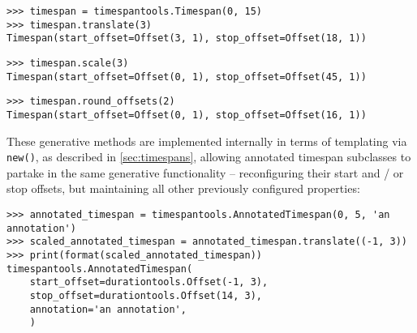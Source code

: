 \begin{abjadbookoutput}
\begin{singlespacing}
\vspace{-0.5\baselineskip}
\begin{lstlisting}
>>> timespan = timespantools.Timespan(0, 15)
>>> timespan.translate(3)
Timespan(start_offset=Offset(3, 1), stop_offset=Offset(18, 1))
\end{lstlisting}
\begin{lstlisting}
>>> timespan.scale(3)
Timespan(start_offset=Offset(0, 1), stop_offset=Offset(45, 1))
\end{lstlisting}
\begin{lstlisting}
>>> timespan.round_offsets(2)
Timespan(start_offset=Offset(0, 1), stop_offset=Offset(16, 1))
\end{lstlisting}
\end{singlespacing}
\end{abjadbookoutput}

\noindent These generative methods are implemented internally in terms of
templating via \texttt{new()}, as described in \autoref{sec:timespans},
allowing annotated timespan subclasses to partake in the same generative
functionality -- reconfiguring their start and / or stop offsets, but
maintaining all other previously configured properties:

\begin{comment}
<abjad>
annotated_timespan = timespantools.AnnotatedTimespan(0, 5, 'an annotation')
scaled_annotated_timespan = annotated_timespan.translate((-1, 3))
print(format(scaled_annotated_timespan))
</abjad>
\end{comment}

\begin{abjadbookoutput}
\begin{singlespacing}
\vspace{-0.5\baselineskip}
\begin{lstlisting}
>>> annotated_timespan = timespantools.AnnotatedTimespan(0, 5, 'an annotation')
>>> scaled_annotated_timespan = annotated_timespan.translate((-1, 3))
>>> print(format(scaled_annotated_timespan))
timespantools.AnnotatedTimespan(
    start_offset=durationtools.Offset(-1, 3),
    stop_offset=durationtools.Offset(14, 3),
    annotation='an annotation',
    )
\end{lstlisting}
\end{singlespacing}
\end{abjadbookoutput}

